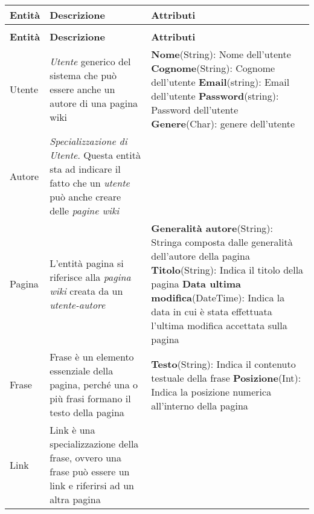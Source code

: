 
\begin{longtable}{|p{2.5cm}|p{6cm}|L|}

\hline
\textbf{Entità} & \textbf{Descrizione} & \textbf{Attributi} \\
\hline

\endfirsthead
{} \\
\hline
\textbf{Entità} & \textbf{Descrizione} & \textbf{Attributi} \\
\hline
\endhead

Utente & 
\textit{Utente} generico del sistema che può 
essere anche un autore di una pagina wiki &
\textbf{Nome}(String): Nome dell'utente \newline
\textbf{Cognome}(String): Cognome dell'utente \newline
\textbf{Email}(string): Email dell'utente \newline
\textbf{Password}(string): Password dell'utente \newline
\textbf{Genere}(Char): genere dell'utente
\\

\hline
Autore & \textit{Specializzazione di Utente}. Questa entità sta ad indicare il fatto che un \textit{utente} può anche creare delle \textit{pagine wiki} &
\\

\hline
Pagina & L'entità pagina si riferisce alla \textit{pagina wiki} creata da un \textit{utente-autore} &
\textbf{Generalità autore}(String): Stringa composta dalle generalità  dell'autore della pagina \newline
\textbf{Titolo}(String): Indica il titolo della pagina \newline
\textbf{Data ultima modifica}(DateTime): Indica la data in cui è stata effettuata l'ultima modifica accettata sulla pagina
\\

\hline
Frase & Frase è un elemento essenziale della pagina, perché una o più frasi
formano il testo della pagina &
\textbf{Testo}(String): Indica il contenuto testuale della frase \newline
\textbf{Posizione}(Int): Indica la posizione numerica all'interno della pagina
\\

\hline
Link & Link è una specializzazione della frase, ovvero una frase può essere un link
e riferirsi ad un altra pagina & \\


\end{longtable}
